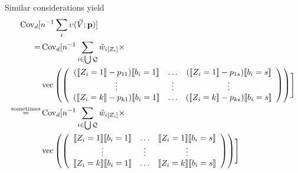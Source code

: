 \documentclass{article}
\DeclarePairedDelimiter{\indicator}{\llbracket}{\rrbracket}
\newcommand{\owt}[1][{[z_{i}]}]{\ensuremath{\check{w}_{i#1}}}
\newcommand{\absorbInterceptsEF}{\upsilon}
\begin{document}
Similar considerations yield
\begin{align}
\operatorname{Cov}_{d}[
  &n^{-1}\sum_{i}\absorbInterceptsEF(\vec{V}; \mathbf{p})] \nonumber\\
  =&\operatorname{Cov}_{d}[n^{-1}
                                                 \sum_{i \in \bigcup
     \mathcal{Q}} \owt[{[Z_{i}]}] \times \nonumber \\
&  \operatorname{vec}\left(%
                                                 \left(
                                                 \begin{array}{ccc}
                                                   (\indicator{Z_{i}=1}-p_{11})\indicator{b_{i}=1}&\ldots&(\indicator{Z_{i}=1}-p_{1s})\indicator{b_{i}=s}\\
                                                   \vdots & \vdots &
                                                                     \vdots
                                                   \\
                                                   (\indicator{Z_{i}=k}-p_{k1})\indicator{b_{i}=1}&\ldots&(\indicator{Z_{i}=k}-p_{ks})\indicator{b_{i}=s}\\                                                   
                                                 \end{array}
  \right)%
  \right)
  \Biggr] \nonumber \\ 
  \stackrel{\text{sometimes}}{=}&\operatorname{Cov}_{d}[n^{-1}
                                                 \sum_{i \in \bigcup
     \mathcal{Q}} \owt[{[Z_{i}]}] \times \nonumber \\
  &\operatorname{vec}\left(%
                                                 \left(
                                                 \begin{array}{ccc}
                                                   \indicator{Z_{i}=1}\indicator{b_{i}=1}&\ldots&\indicator{Z_{i}=1}\indicator{b_{i}=s}\\
                                                   \vdots & \vdots &
                                                                     \vdots
                                                   \\
                                                   \indicator{Z_{i}=k}\indicator{b_{i}=1}&\ldots&\indicator{Z_{i}=k}\indicator{b_{i}=s}\\                                                   
                                                 \end{array}  
  \right)%
  \right)
    \Biggr] \label{eq:11}
\end{align}
\end{document}
